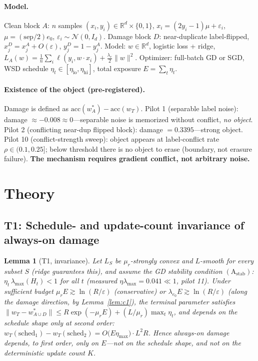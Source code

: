 \documentclass{article}
\newtheorem{lemma}{Lemma}
\newcommand{\Expo}{E}         %
\newcommand{\lam}{\lambda}
\begin{document}
\paragraph{Model.} Clean block $A$: $n$ samples $(x_i,y_i)\in\mathbb{R}^d\times\{0,1\}$,
$x_i=(2y_i-1)\mu+\varepsilon_i$, $\mu=(\mathrm{sep}/2)e_0$, $\varepsilon_i\sim\mathcal{N}(0,I_d)$.
Damage block $D$: near-duplicate label-flipped, $x_j^D=x_j^A+O(\varepsilon)$,
$y_j^D=1-y_j^A$. Model: $w\in\mathbb{R}^d$, logistic loss + ridge,
$L_A(w)=\frac1n\sum_i \ell(y_i,w\!\cdot\!x_i)+\frac{\lambda_r}{2}\|w\|^2$.
Optimizer: full-batch GD or SGD, WSD schedule $\eta_t\in[\eta_{\mathrm{lo}},\eta_{\mathrm{hi}}]$,
total exposure $\Expo=\sum_t\eta_t$.

\paragraph{Existence of the object (pre-registered).} Damage is defined as
$\mathrm{acc}(w^*_A)-\mathrm{acc}(w_T)$. Pilot 1 (separable label noise): damage $\approx-0.008\approx0$---separable noise is memorized without conflict, \emph{no object}. Pilot 2 (conflicting
near-dup flipped block): damage $=0.3395$---strong object. Pilot 10 (conflict-strength sweep):
object appears at label-conflict rate $\rho\in(0.1,0.25]$; below threshold there is no object
to erase (boundary, not erasure failure). \textbf{The mechanism requires gradient conflict, not
arbitrary noise.}

\section{Theory}
\label{sec:theory}

\subsection{T1: Schedule- and update-count invariance of always-on damage}
\label{sec:t1}

\begin{lemma}[T1, invariance]
\label{thm:t1}
Let $L_S$ be $\mu_r$-strongly convex and $L$-smooth for every subset $S$ (ridge guarantees
this), and assume the GD stability condition $(\mathrm{A}_{\mathrm{stab}})$:
$\eta_t\,\lambda_{\max}(H_t)<1$ for all $t$ (measured $\eta\lambda_{\max}=0.041\ll1$, pilot 11).
Under sufficient budget $\mu_r\Expo\gtrsim\ln(R/\varepsilon)$
(conservative) or $\lam_{e_0}\Expo\gtrsim\ln(R/\varepsilon)$ (along the damage direction, by
Lemma~\ref{lem:c1}),
the terminal parameter satisfies
$\|w_T-w^*_{A\cup D}\|\le R\exp(-\mu_r\Expo)+(L/\mu_r)\max_t\eta_t$, and depends on the schedule
shape only at second order:
$w_T(\mathrm{sched}_1)-w_T(\mathrm{sched}_2)=O\!\big(\Expo\eta_{\max}\big)\cdot L^2 R$.
Hence always-on damage depends, to first order, only on $\Expo$---not on the schedule shape, and
not on the deterministic update count $K$.
\end{lemma}
\end{document}

